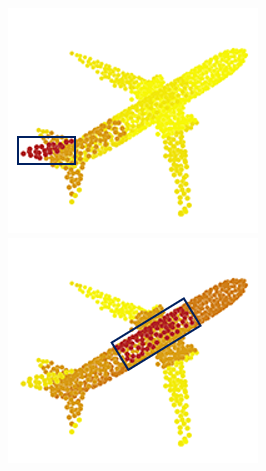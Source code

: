 \documentclass[letterpaper]{article}
\begin{document}
\begin{figure}[htbp]
\begin{center}
\begin{minipage}[b]{0.8\linewidth}
\begin{center}
\begin{minipage}[b]{0.15\linewidth}
\begin{center}
\end{center}
\end{minipage}
\begin{minipage}[b]{0.12\linewidth}
\begin{center}
\includegraphics[width=1.0\linewidth]{images/atten_pic/airplane_attention_1.png}
\end{center}
\end{minipage}
\begin{minipage}[b]{0.12\linewidth}
\begin{center}
\includegraphics[width=1.0\linewidth]{images/atten_pic/airplane_attention_2.png}

\end{center}
\end{minipage}
\end{center}
\end{minipage}
\end{center}
\end{figure}
\end{document}
